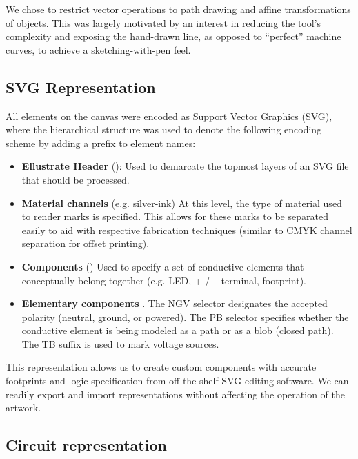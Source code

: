 \documentclass{sigchi}
\begin{document}
    We chose to restrict vector operations to path drawing and affine transformations of objects. This was largely motivated by an interest in reducing the tool's complexity and exposing the hand-drawn line, as opposed to ``perfect'' machine curves, to achieve a sketching-with-pen feel.

    \subsection{SVG Representation}
    All elements on the canvas were encoded as Support Vector Graphics (SVG), where the hierarchical structure was used to denote the following encoding scheme by adding a prefix to element names:
    \begin{itemize}
        \item \textbf{Ellustrate Header} (): Used to demarcate the topmost layers of an SVG file that should be processed.
        \item \textbf{Material channels} (e.g.  silver-ink) At this level, the type of material used to render marks is specified. This allows for these marks to be separated easily to aid with respective fabrication techniques (similar to CMYK channel separation for offset printing).
        \item \textbf{Components} () Used to specify a set of conductive elements that conceptually belong together (e.g. LED, + / – terminal, footprint).
        \item \textbf{Elementary components} .
        The N\textbar G\textbar V selector designates the accepted polarity (neutral, ground, or powered). The P\textbar B selector specifies whether the conductive element is being modeled as a path or as a blob (closed path). The TB suffix is used to mark voltage sources.
    \end{itemize}

    This representation allows us to create custom components with accurate footprints and logic specification from off-the-shelf SVG editing software. We can readily export and import representations without affecting the operation of the artwork.

    \subsection{Circuit representation}
\end{document}
